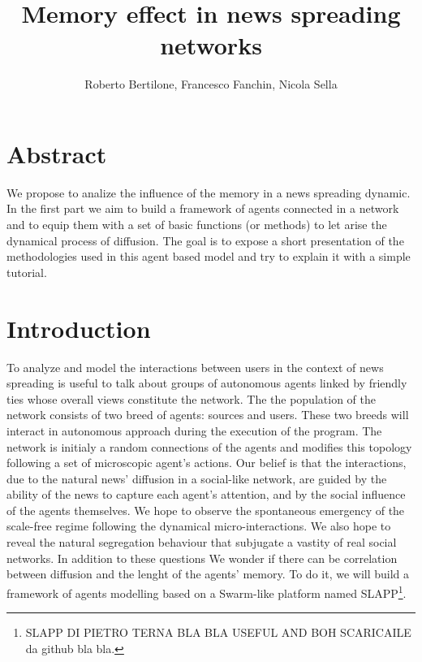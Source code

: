 \documentclass[11pt]{article} %
\title{Memory effect in news spreading networks}
\author{Roberto Bertilone, Francesco Fanchin, Nicola Sella}
\begin{document}
\maketitle
\section*{Abstract}
We propose to analize the influence of the memory in a news spreading dynamic. In the first part we aim to build a framework of agents 
connected in a network and to equip them with a set of basic functions (or methods) to let arise the dynamical process of diffusion.
The goal is to expose a short presentation of the methodologies used in this agent based model and try to explain it with a simple tutorial.

\section{Introduction}

To analyze and model the interactions between users in the context of news spreading is useful to talk about groups of autonomous agents
linked by friendly ties whose overall views constitute the network.
The the population of the network consists of two breed of agents: sources and users. These two breeds will interact
in autonomous approach during the execution of the program.
The network is initialy a random connections of the agents and modifies this topology following a set of microscopic agent's actions.
Our belief is that the interactions, due to the natural news' diffusion in a social-like network, are guided by the ability of the news
to capture each agent's attention, and by the social influence of the agents themselves.
We hope to observe the spontaneous emergency of the scale-free regime following the dynamical micro-interactions. We also hope to reveal 
the natural segregation behaviour that subjugate a vastity of real social networks.
In addition to these questions We wonder if there can be correlation between diffusion and the lenght of the agents' memory.
To do it, we will build a framework of agents modelling based on a Swarm-like platform named SLAPP\footnote{SLAPP DI PIETRO TERNA BLA BLA USEFUL AND BOH SCARICAILE da github bla bla.}.
\end{document}
